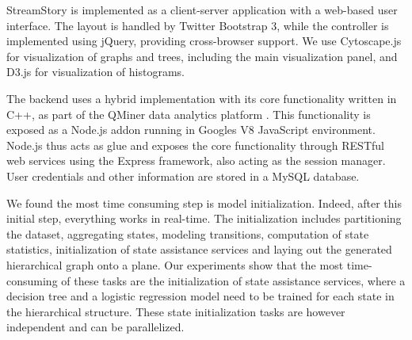StreamStory is implemented as a client-server application with a web-based user interface. %
The layout is handled by Twitter Bootstrap 3,%
 while the controller is implemented using jQuery, providing cross-browser support. We use Cytoscape.js for visualization of graphs and trees, including the main visualization panel, and D3.js for visualization of histograms. %

The backend uses a hybrid implementation with its core functionality written in C++, as part of the QMiner data analytics platform \cite{qminer}. This functionality is exposed as a Node.js addon running in Googles V8 JavaScript environment. Node.js thus acts as glue and exposes the core functionality through RESTful web services using the Express framework, also acting as the session manager. User credentials and other information are stored in a MySQL database.

We found the most time consuming step
is model initialization. Indeed, after this initial step, everything works in real-time.
The initialization includes partitioning the dataset, aggregating states, modeling transitions,
computation of state statistics, initialization of state assistance services and laying out the generated
hierarchical graph onto a plane. Our experiments show that the most time-consuming of these tasks are
the initialization of state assistance services, where a decision tree and a logistic regression
model need to be trained for each state in the hierarchical structure. These state initialization tasks
are however independent and can be parallelized.

